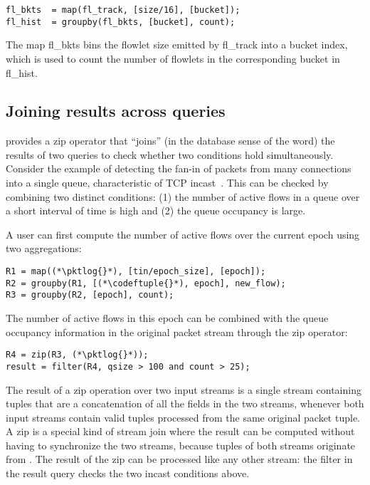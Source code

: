 \begin{lstlisting}
fl_bkts  = map(fl_track, [size/16], [bucket]);
fl_hist  = groupby(fl_bkts, [bucket], count);
\end{lstlisting}

The map {\ct fl\_bkts} bins the flowlet size emitted by {\ct fl\_track} into a
bucket index, which is used to count the number of flowlets in the
corresponding bucket in {\ct fl\_hist}.

\subsection{Joining results across queries} \TheSystem provides a {\ct zip} operator
that ``joins'' (in the database sense of the word) the results of two queries
to check whether two conditions hold simultaneously. Consider the example of
detecting the fan-in of packets from many connections into a single queue,
characteristic of TCP incast~\cite{tcpincast}. This can be checked by combining
two distinct conditions: (1) the number of active flows in a queue over a short
interval of time is high and (2) the queue occupancy is large.

A user can first compute the number of active flows over the current epoch using
two aggregations:

\begin{lstlisting}
R1 = map((*\pktlog{}*), [tin/epoch_size], [epoch]);
R2 = groupby(R1, [(*\codeftuple{}*), epoch], new_flow);
R3 = groupby(R2, [epoch], count);
\end{lstlisting}

The number of active flows in this epoch can be combined with the queue
occupancy information in the original packet stream through the {\ct zip}
operator:

\begin{lstlisting}
R4 = zip(R3, (*\pktlog{}*));
result = filter(R4, qsize > 100 and count > 25);
\end{lstlisting}

The result of a {\ct zip} operation over two input streams is a single stream
containing tuples that are a concatenation of all the fields in the two
streams, whenever both input streams contain valid tuples processed from the
same original packet tuple. A {\ct zip} is a special kind of stream join where
the result can be computed without having to synchronize the two streams,
because tuples of both streams originate from {\ct \pktlog}. The result of the
{\ct zip} can be processed like any other stream: the {\ct filter} in the {\ct
result} query checks the two incast conditions above.

